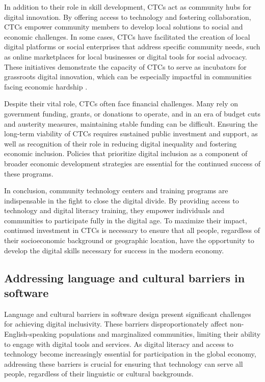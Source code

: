 \begin{refsection}
In addition to their role in skill development, CTCs act as community hubs for digital innovation. By offering access to technology and fostering collaboration, CTCs empower community members to develop local solutions to social and economic challenges. In some cases, CTCs have facilitated the creation of local digital platforms or social enterprises that address specific community needs, such as online marketplaces for local businesses or digital tools for social advocacy. These initiatives demonstrate the capacity of CTCs to serve as incubators for grassroots digital innovation, which can be especially impactful in communities facing economic hardship \cite[pp.~45-48]{fuchscriticalcommunication}.

Despite their vital role, CTCs often face financial challenges. Many rely on government funding, grants, or donations to operate, and in an era of budget cuts and austerity measures, maintaining stable funding can be difficult. Ensuring the long-term viability of CTCs requires sustained public investment and support, as well as recognition of their role in reducing digital inequality and fostering economic inclusion. Policies that prioritize digital inclusion as a component of broader economic development strategies are essential for the continued success of these programs.

In conclusion, community technology centers and training programs are indispensable in the fight to close the digital divide. By providing access to technology and digital literacy training, they empower individuals and communities to participate fully in the digital age. To maximize their impact, continued investment in CTCs is necessary to ensure that all people, regardless of their socioeconomic background or geographic location, have the opportunity to develop the digital skills necessary for success in the modern economy.

\subsection{Addressing language and cultural barriers in software}

Language and cultural barriers in software design present significant challenges for achieving digital inclusivity. These barriers disproportionately affect non-English-speaking populations and marginalized communities, limiting their ability to engage with digital tools and services. As digital literacy and access to technology become increasingly essential for participation in the global economy, addressing these barriers is crucial for ensuring that technology can serve all people, regardless of their linguistic or cultural backgrounds.


\end{refsection}
